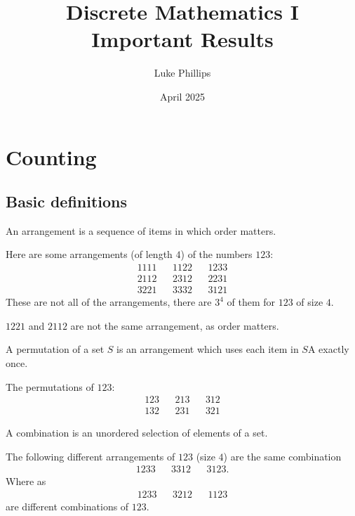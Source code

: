 \documentclass[10pt, a4paper]{article}
\title{Discrete Mathematics I \\
    \large Important Results}
\author{Luke Phillips}
\date{April 2025}
\begin{document}
\maketitle

\newpage

\tableofcontents

\newpage

\section{Counting}

\subsection{Basic definitions}

\begin{definition}[Arrangement]
    An arrangement is a sequence of items in which order matters.
\end{definition}
\begin{example}
    Here are some arrangements
    (of length $4$)
    of the numbers $123$:
    \begin{align*}
        1111 && 1122 && 1233 \\
        2112 && 2312 && 2231 \\
        3221 && 3332 && 3121
    \end{align*}
    These are not all of the arrangements,
    there are $3 ^ 4$ of them for $123$ of size $4$.

    $1221$ and $2112$ are not the same arrangement,
    as order matters.
\end{example}

\begin{definition}[Permutation]
    A permutation of a set $S$ is an arrangement which uses each item in $S$A exactly once.
\end{definition}
\begin{example}
    The permutations of $123$:
    \begin{align*}
        123 && 213 && 312 \\
        132 && 231 && 321
    \end{align*}
\end{example}

\begin{definition}[Combination]
    A combination is an unordered selection of elements of a set.
\end{definition}
\begin{example}
    The following different arrangements of $123$
    (size $4$)
    are the same combination
    \begin{align*}
        1233 && 3312 && 3123.
    \end{align*}
    Where as
    \begin{align*}
        1233 && 3212 && 1123
    \end{align*}
    are different combinations of $123$.
\end{example}
\end{document}
